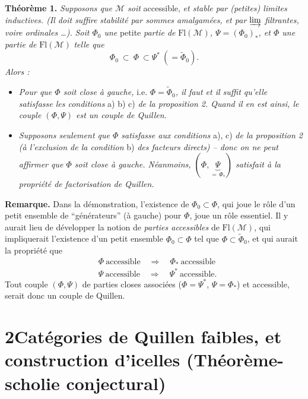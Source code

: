 \documentclass[11pt]{article}
\newcommand{\printedpage}[1]{\marginpar{\footnotesize p.~#1}}
\newcommand{\msp}[1]{\marginpar{\footnotesize [#1]}}
\newcommand{\cM}{\mathcal{M}}
\newcommand{\Fl}{\mathrm{Fl}}
\begin{document}
\setcounter{footnote}{4}

\printedpage{4}
\msp{page 6}\textbf{Théorème 1.} \textit{Supposons que $\cM$ soit} accessible, \textit{et stable par (petites) limites inductives. (Il doit suffire stabilité par sommes amalgamées, et par $\varinjlim$ filtrantes, voire ordinales \dots).} \textit{Soit $\Phi_0$ une} petite \textit{partie de} $\Fl(\cM)$\textit{, $\Psi=(\Phi_0)_*$, et $\Phi$ une partie de} $\Fl(\cM)$ \textit{telle que}
\[
\Phi_0\ \subset\ \Phi\ \subset\Psi^*\ (=\widetilde{\Phi}_0).
\]
\textit{Alors :}

\begin{itemize}[leftmargin=2.5em]
\item[a)] \textit{Pour que $\Phi$ soit close à gauche,} i.e. $\Phi=\widetilde{\Phi}_0$\textit{, il faut et il suffit qu'elle satisfasse les conditions} a) b) c) \textit{de la proposition 2. Quand il en est ainsi, le couple $(\Phi,\Psi)$ est un couple de Quillen.}

\item[b)] \textit{Supposons seulement que $\Phi$ satisfasse aux conditions} a), c) \textit{de la proposition 2 (à l'exclusion de la condition} b) \textit{des facteurs directs) – donc on ne peut affirmer que $\Phi$ soit close à gauche. Néanmoins, $(\Phi,\underbrace{\Psi}_{=\,\Phi_*})$ satisfait à la propriété de factorisation de Quillen.}
\end{itemize}

\textbf{Remarque.} Dans la démonstration, l'existence de $\Phi_0\subset\Phi$, qui joue le rôle d'un petit ensemble de “générateurs” (à gauche) pour $\Phi$, joue un rôle essentiel. Il y aurait lieu de développer la notion de \textit{parties accessibles}
\msp{page 7}
de $\Fl(\cM)$, qui impliquerait l'existence d'un petit ensemble $\Phi_0\subset\Phi$ tel que $\Phi\subset\widetilde{\Phi}_0$, et qui aurait la propriété que
\[
\begin{aligned}
&\Phi\ \text{accessible}\quad\Longrightarrow\quad\Phi_*\ \text{accessible}\\
&\Psi\ \text{accessible}\quad\Longrightarrow\quad\Psi^*\ \text{accessible.}
\end{aligned}
\]
Tout couple $(\Phi,\Psi)$ de parties closes associées ($\Phi=\Psi^*$, $\Psi=\Phi_*$) et accessible, serait donc un couple de Quillen.

\section*{2\quad Catégories de Quillen faibles, et construction d'icelles (Théorème-scholie conjectural)}
\end{document}
